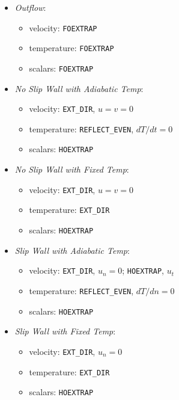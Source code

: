 \begin{itemize}
\item {\it Outflow}:
  \begin{itemize}
    \item velocity: {\tt FOEXTRAP}
    \item temperature: {\tt FOEXTRAP}
    \item scalars: {\tt FOEXTRAP}
  \end{itemize}
  
\item {\it No Slip Wall with Adiabatic Temp}:
  \begin{itemize}
  \item velocity: {\tt EXT\_DIR}, $u=v=0$
  \item temperature: {\tt REFLECT\_EVEN}, $dT/dt=0$
  \item scalars: {\tt HOEXTRAP}
  \end{itemize}

\item {\it No Slip Wall with Fixed Temp}:
  \begin{itemize}
  \item velocity: {\tt EXT\_DIR}, $u=v=0$
  \item temperature: {\tt EXT\_DIR}
  \item scalars: {\tt HOEXTRAP}
  \end{itemize}
    
\item {\it Slip Wall with Adiabatic Temp}:
  \begin{itemize}
  \item velocity: {\tt EXT\_DIR}, $u_n=0$; {\tt HOEXTRAP}, $u_t$
  \item temperature: {\tt REFLECT\_EVEN}, $dT/dn=0$
  \item scalars: {\tt HOEXTRAP}
  \end{itemize}
  
\item {\it Slip Wall with Fixed Temp}:
  \begin{itemize}
  \item velocity: {\tt EXT\_DIR}, $u_n=0$
  \item temperature: {\tt EXT\_DIR}
  \item scalars: {\tt HOEXTRAP}
  \end{itemize}

\end{itemize}

